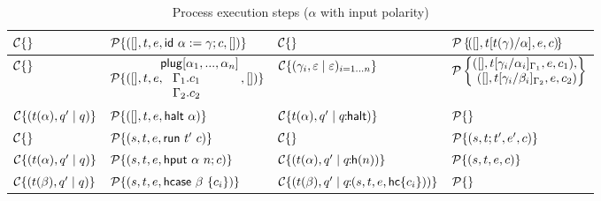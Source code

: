 \documentclass[11pt]{article}
\newcommand{\<}{\langle}
\renewcommand{\>}{\rangle}
\begin{document}
\begin{table}
\begin{center}
\begin{tabular}{|l|l||l|l|}
${\cal C}\{ \}$ & ${\cal P}\{ ([],t,e, {\sf id}~ \alpha:=\gamma;  c ,[]) \} $ 
              & ${\cal C}\{ \} $ & ${\cal P}\left\{ \! ( [],t[t(\gamma)/\alpha],e,c) \! \right\}$ \\ \hline
${\cal C}\{ \}$ & ${\cal P}\{ ([],t,e, \!\!\!\!\!\begin{array}[c]{l}{\sf plug} [\alpha_1,...,\alpha_n]\\
                           ~~~\Gamma_1. c_1 \\
                           ~~~\Gamma_2. c_2  \end{array}\!\!,[]) \} $ 
              & ${\cal C}\{ (\gamma_i,\varepsilon\mid\varepsilon)_{i=1...n}\} $ & ${\cal P}\left\{ \!\!\!\begin{array}[c]{r} ( [],t[\gamma_i/\alpha_i]_{\Gamma_1},e,c_1), \\ ([],t[\gamma_i/\beta_i]_{\Gamma_2},e,c_2) \end{array} \!\!\! \right\}$ \\ \hline
${\cal C}\{ (t(\alpha),q'\mid q) \}$ & ${\cal P}\{ ([],t,e,{\sf halt}~\alpha)\} $ & ${\cal C}\{ t(\alpha),q' \mid q\!\!:\!\!{\sf halt}) \}$ & ${\cal P}\{ \}$ \\ \hline
${\cal C}\{\}$ & ${\cal P}\{ (s,t,e,{\sf run}~t'~c) \}$ & ${\cal C}\{\}$  & ${\cal P}\{ (s,t;t',e',c) \}$ \\ \hline
${\cal C}\{ (t(\alpha),q' \mid q)\}$ & ${\cal P}\{ (s,t,e,{\sf hput}~\alpha~n;c) \}$ & 
${\cal C}\{ (t(\alpha),q' \mid q\!\!:\!\!{\sf h}(n))\} $ & ${\cal P}\{ (s,t,e,c) \}$ \\ \hline
${\cal C}\{ (t(\beta), q' \mid q) \} $ & ${\cal P}\{ (s,t,e,{\sf hcase} ~\beta~\{ c_i \}) \}$ & ${\cal C}\{ (t(\beta), q' \mid q\!\!:\!\!(s,t,e,{\sf hc}\{ c_i\})) \} $ & ${\cal P}\{ \}$ \\ \hline
\end{tabular}
\end{center}
\caption{Process execution steps ($\alpha$ with input polarity)}
\label{process-actions}
\end{table}
\end{document}
